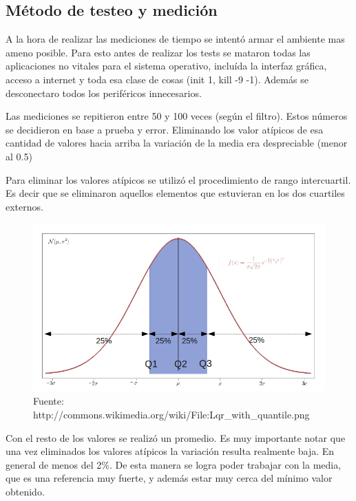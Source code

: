 \subsection*{Método de testeo y medición}

	A la hora de realizar las mediciones de tiempo se intentó armar el ambiente mas
ameno posible. Para esto antes de realizar los tests se mataron todas las aplicaciones
no vitales para el sistema operativo, incluída la interfaz gráfica, acceso a internet y
toda esa clase de cosas (init 1, kill -9 -1). Además se desconectaro todos los periféricos
innecesarios.

	Las mediciones se repitieron entre 50 y 100 veces (según el filtro). Estos números se
decidieron en base a prueba y error. Eliminando los valor atípicos de esa cantidad
de valores hacia arriba la variación de la media era despreciable (menor al 0.5)

	Para eliminar los valores atípicos se utilizó el procedimiento de rango intercuartil. Es decir
que se eliminaron aquellos elementos que estuvieran en los dos cuartiles externos.


\begin{figure}[h]
\begin{center}
  \includegraphics[scale=0.5]{secciones/consideraciones/imagenes/cuartiles.png}
\end{center}
\caption{Fuente: http://commons.wikimedia.org/wiki/File:Lqr\_with\_quantile.png}
\label{fig:filtro-color-ejemplo}
\end{figure}

	Con el resto de los valores se realizó un promedio. Es muy importante notar que una vez eliminados los valores
atípicos la variación resulta realmente baja. En general de menos del 2\%. De esta manera se logra poder trabajar
con la media, que es una referencia muy fuerte, y además estar muy cerca del mínimo valor obtenido.

	

	


